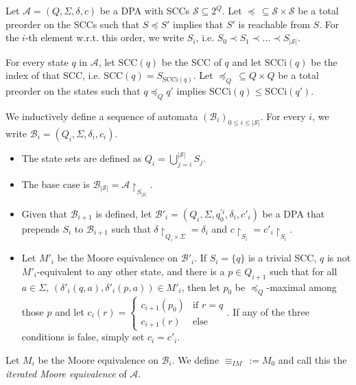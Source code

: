 \begin{defn}
\label{def:fwe:itmoore}
	Let $\mathcal{A} = (Q, \Sigma, \delta, c)$ be a DPA with SCCs $\mathcal{S} \subseteq 2^Q$. Let $\preceq \,\subseteq \mathcal{S} \times \mathcal{S}$ be a total preorder on the SCCs such that $S \preceq S'$ implies that $S'$ is reachable from $S$. For the $i$-th element w.r.t. this order, we write $S_i$, i.e. $S_0 \prec S_1 \prec \dots \prec S_{|\mathcal{S}|}$. 
	
	For every state $q$ in $\mathcal{A}$, let $\text{SCC}(q)$ be the SCC of $q$ and let $\text{SCCi}(q)$ be the index of that SCC, i.e. $\text{SCC}(q) = S_{\text{SCCi}(q)}$. Let $\preceq_Q \,\subseteq Q \times Q$ be a total preorder on the states such that $q \preceq_Q q'$ implies $\text{SCCi}(q) \leq \text{SCCi}(q')$.
	
	We inductively define a sequence of automata $(\mathcal{B}_i)_{0 \leq i \leq |\mathcal{S}|}$. For every $i$, we write $\mathcal{B}_i = (Q_i, \Sigma, \delta_i, c_i)$.
	
	\begin{itemize}
		\item The state sets are defined as $Q_i = \bigcup_{j=i}^{|\mathcal{S}|} S_j$.
		\item The base case is $\mathcal{B}_{|\mathcal{S}|} = \mathcal{A}\upharpoonright_{S_{|\mathcal{S}|}}$.
		\item Given that $\mathcal{B}_{i+1}$ is defined, let $\mathcal{B}'_i = (Q_i, \Sigma, q_0^{\prime i}, \delta_i, c'_i)$ be a DPA that prepends $S_i$ to $\mathcal{B}_{i+1}$ such that $\delta \upharpoonright_{Q_i \times \Sigma} = \delta_i$ and $c \upharpoonright_{S_i} = c'_i \upharpoonright_{S_i}$.
		\item Let $M'_i$ be the Moore equivalence on $\mathcal{B}'_i$. If $S_i = \{q\}$ is a trivial SCC, $q$ is not $M'_i$-equivalent to any other state, and there is a $p \in Q_{i+1}$ such that for all $a \in \Sigma$, $(\delta'_i(q, a), \delta'_i(p, a)) \in M'_i$, then let $p_0$ be $\preceq_Q$-maximal among those $p$ and let $c_i(r) = \begin{cases} c_{i+1}(p_0) & \text{if } r = q \\ c_{i+1}(r) & \text{else} \end{cases}$. If any of the three conditions is false, simply set $c_i = c'_i$.
	\end{itemize} 
	
	Let $M_i$ be the Moore equivalence on $\mathcal{B}_i$. We define $\equiv_{IM} \,:= M_0$ and call this the \emph{iterated Moore equivalence} of $\mathcal{A}$.
\end{defn}

